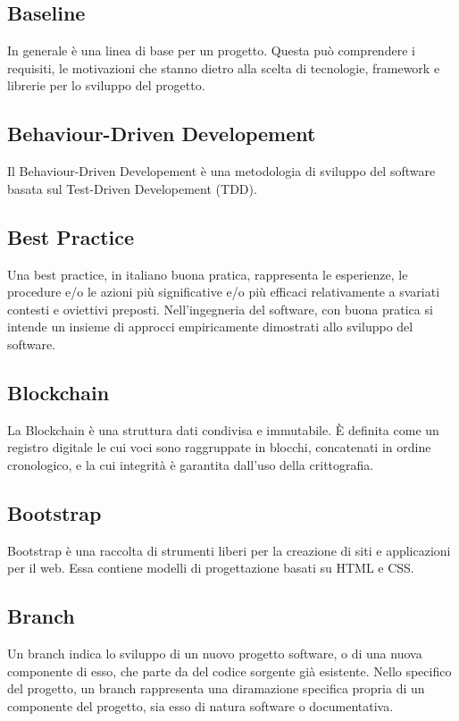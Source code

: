 
\subsection*{Baseline}
In generale è una linea di base per un progetto. Questa può comprendere i requisiti, le motivazioni che stanno dietro alla scelta di tecnologie, framework e librerie per lo sviluppo del progetto.

\subsection*{Behaviour-Driven Developement}
Il Behaviour-Driven Developement è una metodologia di sviluppo del software basata sul Test-Driven Developement (TDD).

\subsection*{Best Practice}
Una best practice, in italiano buona pratica, rappresenta le esperienze, le procedure e/o le azioni più significative e/o più efficaci relativamente a svariati contesti e oviettivi preposti. Nell'ingegneria del software, con buona pratica si intende un insieme di approcci empiricamente dimostrati allo sviluppo del software.

\subsection*{Blockchain}
La Blockchain è una struttura dati condivisa e immutabile. È definita come un registro digitale le cui voci sono raggruppate in blocchi, concatenati in ordine cronologico, e la cui integrità è garantita dall'uso della crittografia.

\subsection*{Bootstrap}
Bootstrap è una raccolta di strumenti liberi per la creazione di siti e applicazioni per il web. Essa contiene modelli di progettazione basati su HTML e CSS.

\subsection*{Branch}
Un branch indica lo sviluppo di un nuovo progetto software, o di una nuova componente di esso, che parte da del codice sorgente già esistente. Nello specifico del progetto, un branch rappresenta una diramazione specifica propria di un componente del progetto, sia esso di natura software o documentativa.

